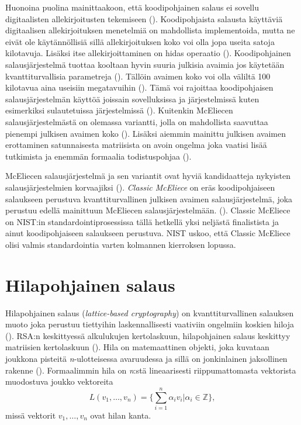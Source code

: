 Huonoina puolina mainittaakoon, että koodipohjainen salaus ei sovellu digitaalisten allekirjoitusten tekemiseen (\cite{8012331}). Koodipohjaista salausta käyttäviä digitaalisen allekirjoituksen menetelmiä on mahdollista implementoida, mutta ne eivät ole käytännöllisiä sillä allekirjoituksen koko voi olla jopa useita satoja kilotavuja. Lisäksi itse allekirjoittaminen on hidas operaatio (\cite{buchmann2016post}). Koodipohjainen salausjärjestelmä tuottaa kooltaan hyvin suuria julkisia avaimia jos käytetään kvanttiturvallisia parametreja (\cite{8012331}). Tällöin avaimen koko voi olla väliltä 100 kilotavua aina useisiin megatavuihin (\cite{mavroeidis2018impact}). Tämä voi rajoittaa koodipohjaisen salausjärjestelmän käyttöä joissain sovelluksissa ja järjestelmissä kuten esimerkiksi sulautetuissa järjestelmissä (\cite{repka2014overview}). Kuitenkin McEliecen salausjärjestelmästä on olemassa variantti, jolla on mahdollista saavuttaa pienempi julkisen avaimen koko (\cite{buchmann2016post}). Lisäksi aiemmin mainittu julkisen avaimen erottaminen satunnaisesta matriisista on avoin ongelma joka vaatisi lisää tutkimista ja enemmän formaalia todistuspohjaa (\cite{8012331}).

McEliecen salausjärjestelmä ja sen variantit ovat hyviä kandidaatteja nykyisten salausjärjestelmien korvaajiksi (\cite{8012331}). \emph{Classic McEliece} on eräs koodipohjaiseen salaukseen perustuva kvanttiturvallinen julkisen avaimen salausjärjestelmä, joka perustuu edellä mainittuun McEliecen salausjärjestelmään. (\cite{alagic2020status}). Classic McEliece on NIST:in standardointiprosessissa tällä hetkellä yksi neljästä finalistista ja ainut koodipohjaiseen salaukseen perustuva. NIST uskoo, että Classic McEliece olisi valmis standardointia varten kolmannen kierroksen lopussa.

\section{Hilapohjainen salaus}
Hilapohjainen salaus (\emph{lattice-based cryptography}) on kvanttiturvallinen salauksen muoto joka perustuu tiettyihin laskennallisesti vaativiin ongelmiin koskien hiloja (\cite{regev2006lattice}). RSA:n keskittyessä alkulukujen kertolaskuun, hilapohjainen salaus keskittyy matriisien kertolaskuun (\cite{mavroeidis2018impact}). Hila on matemaattinen objekti, joka kuvataan joukkona pisteitä \emph{n}-ulotteisessa avaruudessa ja sillä on jonkinlainen jaksollinen rakenne (\cite{regev2006lattice}). Formaalimmin hila on \emph{n}:stä lineaarisesti riippumattomasta vektorista muodostuva joukko vektoreita 
\[L(v_1, \ldots ,v_n) =\Bigg\{ {\sum_{i=1}^{n}\alpha_i 
v_i|\alpha_i \in \mathbb{Z}} \Bigg\},\]
missä vektorit $v_1, \ldots ,v_n$ ovat hilan kanta.

